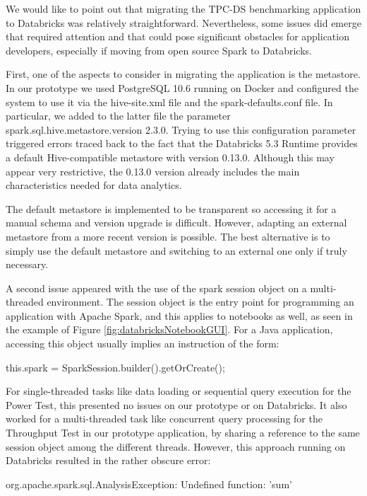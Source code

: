 We would like to point out that migrating the TPC-DS benchmarking application to Databricks was relatively straightforward. Nevertheless, some issues did emerge that required attention and that could pose significant obstacles for application developers, especially if moving from open source Spark to Databricks.

First, one of the aspects to consider in migrating the application is the metastore. In our prototype we used PostgreSQL 10.6 running on Docker and configured the system to use it via the hive-site.xml file and the spark-defaults.conf file. In particular, we added to the latter file the parameter spark.sql.hive.metastore.version 2.3.0. Trying to use this configuration parameter triggered errors traced back to the fact that the Databricks 5.3 Runtime provides a default Hive-compatible metastore with version 0.13.0. Although this may appear very restrictive, the 0.13.0 version already includes the main characteristics needed for data analytics.

The default metastore is implemented to be transparent so accessing it for a manual schema and version upgrade is difficult. However, adapting an external metastore from a more recent version is possible. The best alternative is to simply use the default metastore and switching to an external one only if truly necessary.

A second issue appeared with the use of the spark session object on a multi-threaded environment. The session object is the entry point for programming an application with Apache Spark, and this applies to notebooks as well, as seen in the example of Figure \ref{fig:databricksNotebookGUI}. For a Java application, accessing this object usually implies an instruction of the form:

\vspace{0.5cm}
\noindent this.spark = SparkSession.builder().getOrCreate();
\vspace{0.5cm}

For single-threaded tasks like data loading or sequential query execution for the Power Test, this presented no issues on our prototype or on Databricks. It also worked for a multi-threaded task like concurrent query processing for the Throughput Test in our prototype application, by sharing a reference to the same session object among the different threads. However, this approach running on Databricks resulted in the rather
obscure error:

\vspace{0.5cm}
\noindent org.apache.spark.sql.AnalysisException: Undefined function: 'sum' 
\vspace{0.5cm}

